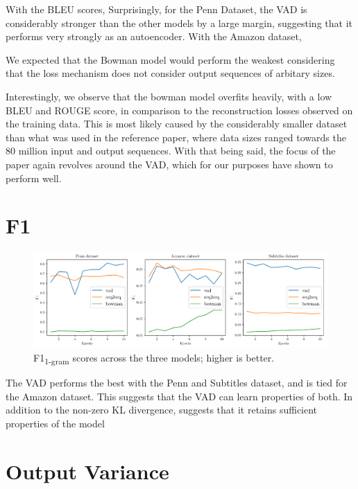 \documentclass[12pt,twoside]{report}
\begin{document}
With the BLEU scores, Surprisingly, for the Penn Dataset, the VAD is considerably stronger than the other models by a large margin, suggesting that it performs very strongly as an autoencoder. With the Amazon dataset, 


We expected that the Bowman model would perform the weakest considering that the loss mechanism does not consider output sequences of arbitary sizes.

Interestingly, we observe that the bowman model overfits heavily, with a low BLEU and ROUGE score, in comparison to the reconstruction losses observed on the training data. This is most likely caused by the considerably smaller dataset than what was used in the reference paper, where data sizes ranged towards the 80 million input and output sequences. With that being said, the focus of the paper again revolves around the VAD, which for our purposes have shown to perform well.

\section{F1}

\begin{figure}[!ht]
	\centering
	\includegraphics[width=150mm]{results/f1.pdf}
	\caption{F1\textsubscript{1-gram} scores across the three models; higher is better.\label{r:f1}}
	\end{figure}
	
The VAD performs the best with the Penn and Subtitles dataset, and is tied for the Amazon dataset. This suggests that the VAD can learn properties of both.
In addition to the non-zero KL divergence, suggests that it retains sufficient properties of the model 


\section{Output Variance}
\end{document}
